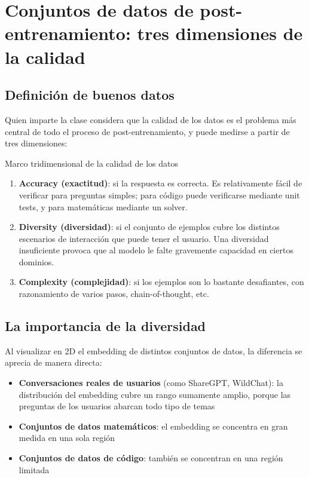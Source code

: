 \section{Conjuntos de datos de post-entrenamiento: tres dimensiones de la calidad}

\subsection{Definición de buenos datos}

Quien imparte la clase considera que la calidad de los datos es el problema más central de todo el proceso de post-entrenamiento, y puede medirse a partir de tres dimensiones:

\begin{importantbox}{Marco tridimensional de la calidad de los datos}
\begin{enumerate}
    \item \textbf{Accuracy (exactitud)}: si la respuesta es correcta. Es relativamente fácil de verificar para preguntas simples; para código puede verificarse mediante unit tests, y para matemáticas mediante un solver.
    \item \textbf{Diversity (diversidad)}: si el conjunto de ejemplos cubre los distintos escenarios de interacción que puede tener el usuario. Una diversidad insuficiente provoca que al modelo le falte gravemente capacidad en ciertos dominios.
    \item \textbf{Complexity (complejidad)}: si los ejemplos son lo bastante desafiantes, con razonamiento de varios pasos, chain-of-thought, etc.
\end{enumerate}
\end{importantbox}

\subsection{La importancia de la diversidad}

Al visualizar en 2D el embedding de distintos conjuntos de datos, la diferencia se aprecia de manera directa:

\begin{itemize}
    \item \textbf{Conversaciones reales de usuarios} (como ShareGPT, WildChat): la distribución del embedding cubre un rango sumamente amplio, porque las preguntas de los usuarios abarcan todo tipo de temas
    \item \textbf{Conjuntos de datos matemáticos}: el embedding se concentra en gran medida en una sola región
    \item \textbf{Conjuntos de datos de código}: también se concentran en una región limitada
\end{itemize}

